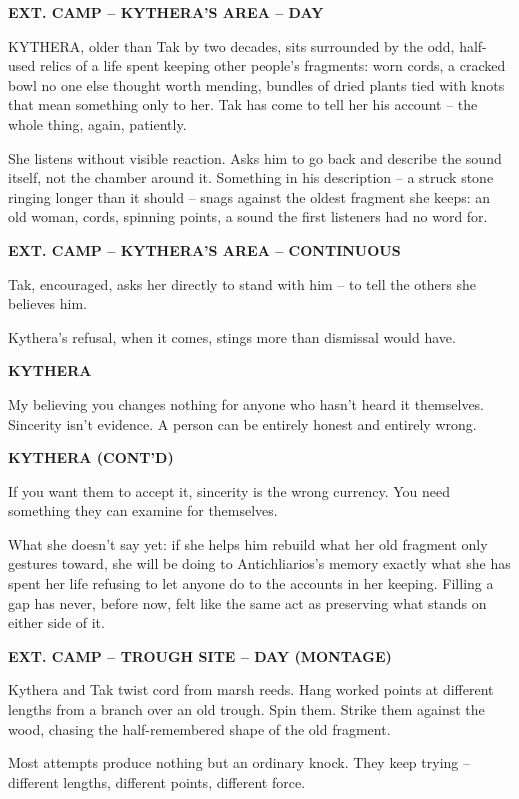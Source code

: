 \documentclass[12pt]{article}
\newcommand{\sceneheading}[1]{%
  \bigskip\noindent\textbf{#1}\par\smallskip
}
\newcommand{\action}[1]{%
  \noindent #1\par\medskip
}
\newcommand{\charcue}[1]{%
  \par\hspace*{2.2in}\textbf{#1}\par
}
\newenvironment{dialogue}{%
  \begin{list}{}{\leftmargin=1.5in\rightmargin=2in\itemsep=0pt\parsep=0pt\topsep=0pt}
  \item[]
}{%
  \end{list}\medskip
}
\begin{document}
\sceneheading{EXT. CAMP -- KYTHERA'S AREA -- DAY}

\action{KYTHERA, older than Tak by two decades, sits surrounded by the odd, half-used relics of a life spent keeping other people's fragments: worn cords, a cracked bowl no one else thought worth mending, bundles of dried plants tied with knots that mean something only to her. Tak has come to tell her his account -- the whole thing, again, patiently.}

\action{She listens without visible reaction. Asks him to go back and describe the sound itself, not the chamber around it. Something in his description -- a struck stone ringing longer than it should -- snags against the oldest fragment she keeps: an old woman, cords, spinning points, a sound the first listeners had no word for.}

\sceneheading{EXT. CAMP -- KYTHERA'S AREA -- CONTINUOUS}

\action{Tak, encouraged, asks her directly to stand with him -- to tell the others she believes him.}

\action{Kythera's refusal, when it comes, stings more than dismissal would have.}

\charcue{KYTHERA}
\begin{dialogue}
My believing you changes nothing for anyone who hasn't heard it themselves. Sincerity isn't evidence. A person can be entirely honest and entirely wrong.
\end{dialogue}

\charcue{KYTHERA (CONT'D)}
\begin{dialogue}
If you want them to accept it, sincerity is the wrong currency. You need something they can examine for themselves.
\end{dialogue}

\action{What she doesn't say yet: if she helps him rebuild what her old fragment only gestures toward, she will be doing to Antichliarios's memory exactly what she has spent her life refusing to let anyone do to the accounts in her keeping. Filling a gap has never, before now, felt like the same act as preserving what stands on either side of it.}

\sceneheading{EXT. CAMP -- TROUGH SITE -- DAY (MONTAGE)}

\action{Kythera and Tak twist cord from marsh reeds. Hang worked points at different lengths from a branch over an old trough. Spin them. Strike them against the wood, chasing the half-remembered shape of the old fragment.}

\action{Most attempts produce nothing but an ordinary knock. They keep trying -- different lengths, different points, different force.}
\end{document}
